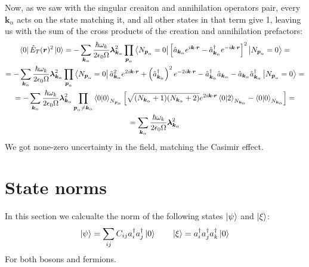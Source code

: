 \documentclass{article}
\begin{document}
Now, as we saw with the singular creaiton and annihilation operators pair, every $\boldsymbol{k}_\alpha$ acts on the state matching it, and all other states in that term give 1, leaving us with the sum of the cross products of the creation and annihilation prefactors:
\begin{equation}
\begin{gathered}
    \bra{0}\hat{E}_T(\boldsymbol{r})^2\ket{0} = -
    \sum_{\boldsymbol{k}_\alpha} \frac{\hbar \omega_k}{2\epsilon_0\Omega}\boldsymbol{\lambda}_{\boldsymbol{k}_\alpha}^2
    \prod_{\boldsymbol{p}_\alpha} \bra{N_{\boldsymbol{p}_\alpha} = 0}
    \left[
        \hat{a}_{\boldsymbol{k}_\alpha} e^{i\boldsymbol{k}\cdot\boldsymbol{r}}
        -
        \hat{a}_{\boldsymbol{k}_\alpha}^\dagger e^{-i\boldsymbol{k}\cdot\boldsymbol{r}}
    \right]^2
    \ket{N_{\boldsymbol{p}_\alpha} = 0} = \\ =
    -\sum_{\boldsymbol{k}_\alpha} \frac{\hbar \omega_k}{2\epsilon_0\Omega}\boldsymbol{\lambda}_{\boldsymbol{k}_\alpha}^2
    \prod_{\boldsymbol{p}_\alpha} \bra{N_{\boldsymbol{p}_\alpha} = 0}
    \hat{a}_{\boldsymbol{k}_\alpha}^2 e^{2i\boldsymbol{k}\cdot\boldsymbol{r}}
    +
    \left(\hat{a}_{\boldsymbol{k}_\alpha}^\dagger\right)^2 e^{-2i\boldsymbol{k}\cdot\boldsymbol{r}}
    -
    \hat{a}_{\boldsymbol{k}_\alpha}^\dagger \hat{a}_{\boldsymbol{k}_\alpha} - \hat{a}_{\boldsymbol{k}_\alpha} \hat{a}_{\boldsymbol{k}_\alpha}^\dagger
    \ket{N_{\boldsymbol{p}_\alpha} = 0} = \\ =
    -\sum_{\boldsymbol{k}_\alpha} \frac{\hbar \omega_k}{2\epsilon_0\Omega}\boldsymbol{\lambda}_{\boldsymbol{k}_\alpha}^2
    \prod_{\boldsymbol{p}_\alpha \ne \boldsymbol{k}_\alpha} \braket{0}{0}_{N_{\boldsymbol{p}_\alpha}}\left[\sqrt{(N_{\boldsymbol{k}_\alpha} + 1)(N_{\boldsymbol{k}_\alpha} + 2)}e^{2i\boldsymbol{k}\cdot\boldsymbol{r}}\braket{0}{2}_{N_{\boldsymbol{k}_\alpha}} - \braket{0}{0}_{N_{\boldsymbol{k}_\alpha}}\right] = \\ = 
    \sum_{\boldsymbol{k}_\alpha} \frac{\hbar \omega_k}{2\epsilon_0\Omega}\boldsymbol{\lambda}_{\boldsymbol{k}_\alpha}^2
\end{gathered}
\end{equation}
We got none-zero uncertainty in the field, matching the Casimir effect.
\newpage
\section{State norms}
In this section we calcualte the norm of the following states $\ket{\psi}$ and $\ket{\xi}$:
\begin{equation}
    \ket{\psi} = \sum_{ij}C_{ij}a^{\dagger}_ia^{\dagger}_j\ket{0}
    \qquad
    \ket{\xi} = a^\dagger_i a^\dagger_j a^\dagger_k \ket{0}
\end{equation}
For both bosons and fermions.
\end{document}
